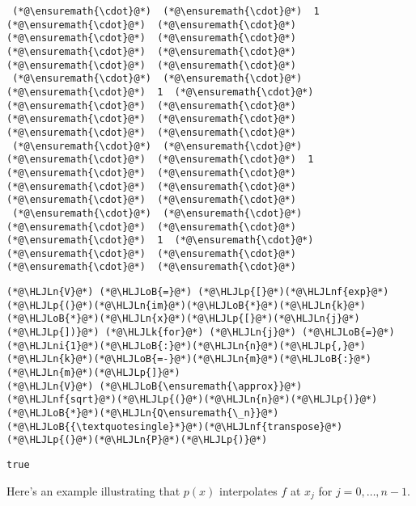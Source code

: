 \documentclass[12pt,a4paper]{article}
\newcommand{\HLJLk}[1]{\textcolor[RGB]{148,91,176}{\textbf{#1}}}
\newcommand{\HLJLn}[1]{#1}
\newcommand{\HLJLnf}[1]{\textcolor[RGB]{66,102,213}{#1}}
\newcommand{\HLJLni}[1]{\textcolor[RGB]{59,151,46}{#1}}
\newcommand{\HLJLoB}[1]{\textcolor[RGB]{102,102,102}{\textbf{#1}}}
\newcommand{\HLJLp}[1]{#1}
\begin{document}
\begin{lstlisting}
 (*@\ensuremath{\cdot}@*)  (*@\ensuremath{\cdot}@*)  1  (*@\ensuremath{\cdot}@*)  (*@\ensuremath{\cdot}@*)  (*@\ensuremath{\cdot}@*)  (*@\ensuremath{\cdot}@*)  (*@\ensuremath{\cdot}@*)  (*@\ensuremath{\cdot}@*)  (*@\ensuremath{\cdot}@*)  (*@\ensuremath{\cdot}@*)
 (*@\ensuremath{\cdot}@*)  (*@\ensuremath{\cdot}@*)  (*@\ensuremath{\cdot}@*)  1  (*@\ensuremath{\cdot}@*)  (*@\ensuremath{\cdot}@*)  (*@\ensuremath{\cdot}@*)  (*@\ensuremath{\cdot}@*)  (*@\ensuremath{\cdot}@*)  (*@\ensuremath{\cdot}@*)  (*@\ensuremath{\cdot}@*)
 (*@\ensuremath{\cdot}@*)  (*@\ensuremath{\cdot}@*)  (*@\ensuremath{\cdot}@*)  (*@\ensuremath{\cdot}@*)  1  (*@\ensuremath{\cdot}@*)  (*@\ensuremath{\cdot}@*)  (*@\ensuremath{\cdot}@*)  (*@\ensuremath{\cdot}@*)  (*@\ensuremath{\cdot}@*)  (*@\ensuremath{\cdot}@*)
 (*@\ensuremath{\cdot}@*)  (*@\ensuremath{\cdot}@*)  (*@\ensuremath{\cdot}@*)  (*@\ensuremath{\cdot}@*)  (*@\ensuremath{\cdot}@*)  1  (*@\ensuremath{\cdot}@*)  (*@\ensuremath{\cdot}@*)  (*@\ensuremath{\cdot}@*)  (*@\ensuremath{\cdot}@*)  (*@\ensuremath{\cdot}@*)
\end{lstlisting}


\begin{lstlisting}
(*@\HLJLn{V}@*) (*@\HLJLoB{=}@*) (*@\HLJLp{[}@*)(*@\HLJLnf{exp}@*)(*@\HLJLp{(}@*)(*@\HLJLn{im}@*)(*@\HLJLoB{*}@*)(*@\HLJLn{k}@*)(*@\HLJLoB{*}@*)(*@\HLJLn{x}@*)(*@\HLJLp{[}@*)(*@\HLJLn{j}@*)(*@\HLJLp{])}@*) (*@\HLJLk{for}@*) (*@\HLJLn{j}@*) (*@\HLJLoB{=}@*) (*@\HLJLni{1}@*)(*@\HLJLoB{:}@*)(*@\HLJLn{n}@*)(*@\HLJLp{,}@*) (*@\HLJLn{k}@*)(*@\HLJLoB{=-}@*)(*@\HLJLn{m}@*)(*@\HLJLoB{:}@*)(*@\HLJLn{m}@*)(*@\HLJLp{]}@*)
(*@\HLJLn{V}@*) (*@\HLJLoB{\ensuremath{\approx}}@*) (*@\HLJLnf{sqrt}@*)(*@\HLJLp{(}@*)(*@\HLJLn{n}@*)(*@\HLJLp{)}@*)(*@\HLJLoB{*}@*)(*@\HLJLn{Q\ensuremath{\_n}}@*)(*@\HLJLoB{{\textquotesingle}*}@*)(*@\HLJLnf{transpose}@*)(*@\HLJLp{(}@*)(*@\HLJLn{P}@*)(*@\HLJLp{)}@*)
\end{lstlisting}

\begin{lstlisting}
true
\end{lstlisting}


Here's an example illustrating that $p(x)$ interpolates $f$ at $x_{j}$ for $j = 0, \ldots, n-1$.
\end{document}
